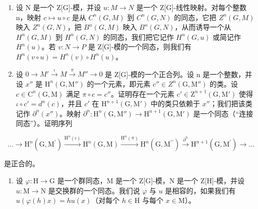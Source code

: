 \begin{enumerate}
\def\labelenumi{\alph{enumi})}
\setcounter{enumi}{1}
\item
  设 N 是一个 Z{[}G{]}-模，并设 \(u : M \to N\) 是一个 Z{[}G{]}-线性映射。对每个整数 n，映射 \(c \mapsto u \circ c\) 是从 \(C^{n}(G, M)\) 到 \(C^{n}(G, N)\) 的同态，它把 \(Z^{n}(G, M)\) 映入 \(Z^{n}(G, N)\)，把 \(B^{n}(G, M)\) 映入 \(B^{n}(G, N)\)，从而诱导一个从 \(H^{n}(G, M)\) 到 \(H^{n}(G, N)\) 的同态，我们把它记作 \(H^{n}(G, u)\) 或简记作 \(H^{n}(u)\)。若 \(v : N \to P\) 是 Z{[}G{]}-模的一个同态，则我们有 \(H^{n}(v \circ u) = H^{n}(v) \circ H^{n}(u)\)。
\item
  设 \(0 \to M' \xrightarrow{\iota} M \xrightarrow{\pi} M'' \to 0\) 是 Z{[}G{]}-模的一个正合列。设 n 是一个整数，并设 \(x''\) 是 \(\mathrm{H}^{n}(\mathrm{G},\mathrm{M}'')\) 的一个元素，即元素 \(c'' \in Z^{n}(\mathrm{G},\mathrm{M}'')\) 的类。设 \(c \in \mathrm{C}^{n}(\mathrm{G},\mathrm{M})\) 满足 \(\pi \circ c = c''\)。证明存在一个元素 \(c' \in \mathrm{Z}^{n+1}(\mathrm{G},\mathrm{M}')\) 使得 \(\iota \circ c' = d^{n}(c)\)，并且 \(c'\) 在 \(\mathrm{H}^{n+1}(\mathrm{G},\mathrm{M}')\) 中的类只依赖于 \(x''\)；我们把该类记作 \(\partial^{n}(x'')\)。映射 \(\partial^{n}: \mathrm{H}^{n}(\mathrm{G},\mathrm{M}'') \to \mathrm{H}^{n+1}(\mathrm{G},\mathrm{M}')\) 是一个同态（“连接同态”）。证明序列
\end{enumerate}

\[
\dots \longrightarrow \mathrm{H} ^ {n} (\mathrm{G}, \mathrm{M} ^ {\prime}) \stackrel {{\mathrm{H} ^ {n} (\iota)}} {{\longrightarrow}} \mathrm{H} ^ {n} (\mathrm{G}, \mathrm{M}) \stackrel {{\mathrm{H} ^ {n} (\pi)}} {{\longrightarrow}} \mathrm{H} ^ {n} (\mathrm{G}, \mathrm{M} ^ {\prime \prime}) \stackrel {{\partial^ {n}}} {{\longrightarrow}} \mathrm{H} ^ {n + 1} (\mathrm{G}, \mathrm{M} ^ {\prime}) \longrightarrow \dots
\]

是正合的。

\begin{enumerate}
\def\labelenumi{\arabic{enumi})}
\setcounter{enumi}{1}
\tightlist
\item
  设 \(\varphi : \mathrm{H} \to \mathrm{G}\) 是一个群同态，M 是一个 Z{[}G{]}-模，N 是一个 Z{[}H{]}-模，并设 \(u : \mathrm{M} \to \mathrm{N}\) 是交换群的一个同态。我们说 \(\varphi\) 与 \(u\) 是相容的，如果我们有 \(u(\varphi(h)x) = hu(x)\)（对每个 \(h \in \mathrm{H}\) 与每个 \(x \in \mathrm{M}\)）。
\end{enumerate}

